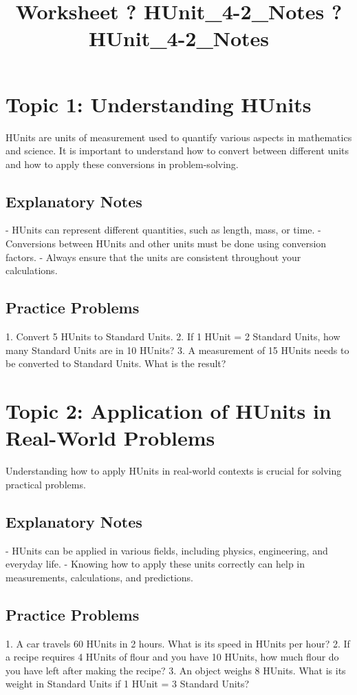 \documentclass{article}
\title{Worksheet ? HUnit\_4-2\_Notes ? HUnit\_4-2\_Notes}
\author{}
\date{}
\begin{document}
\maketitle

\section*{Topic 1: Understanding HUnits}
HUnits are units of measurement used to quantify various aspects in mathematics and science. It is important to understand how to convert between different units and how to apply these conversions in problem-solving.

\subsection*{Explanatory Notes}
- HUnits can represent different quantities, such as length, mass, or time.
- Conversions between HUnits and other units must be done using conversion factors.
- Always ensure that the units are consistent throughout your calculations.

\subsection*{Practice Problems}
1. Convert 5 HUnits to Standard Units.
2. If 1 HUnit = 2 Standard Units, how many Standard Units are in 10 HUnits?
3. A measurement of 15 HUnits needs to be converted to Standard Units. What is the result?

\section*{Topic 2: Application of HUnits in Real-World Problems}
Understanding how to apply HUnits in real-world contexts is crucial for solving practical problems.

\subsection*{Explanatory Notes}
- HUnits can be applied in various fields, including physics, engineering, and everyday life.
- Knowing how to apply these units correctly can help in measurements, calculations, and predictions.

\subsection*{Practice Problems}
1. A car travels 60 HUnits in 2 hours. What is its speed in HUnits per hour?
2. If a recipe requires 4 HUnits of flour and you have 10 HUnits, how much flour do you have left after making the recipe?
3. An object weighs 8 HUnits. What is its weight in Standard Units if 1 HUnit = 3 Standard Units?
\end{document}
